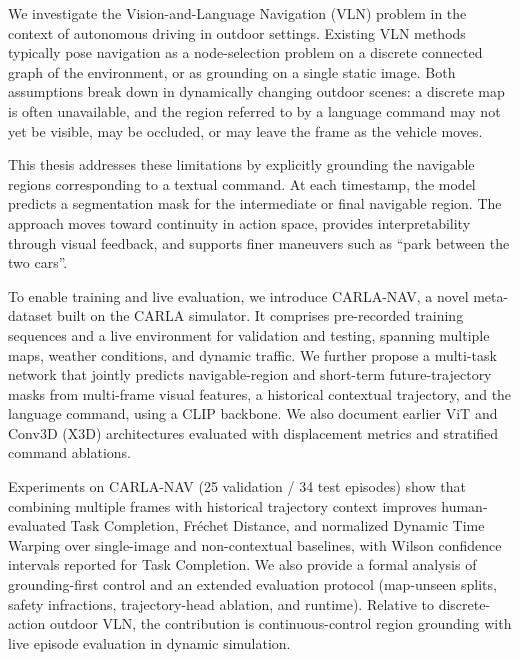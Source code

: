 We investigate the Vision-and-Language Navigation (VLN) problem in the context of autonomous driving in outdoor settings. Existing VLN methods typically pose navigation as a node-selection problem on a discrete connected graph of the environment, or as grounding on a single static image. Both assumptions break down in dynamically changing outdoor scenes: a discrete map is often unavailable, and the region referred to by a language command may not yet be visible, may be occluded, or may leave the frame as the vehicle moves.

This thesis addresses these limitations by explicitly grounding the navigable regions corresponding to a textual command. At each timestamp, the model predicts a segmentation mask for the intermediate or final navigable region. The approach moves toward continuity in action space, provides interpretability through visual feedback, and supports finer maneuvers such as ``park between the two cars''.

To enable training and live evaluation, we introduce CARLA-NAV, a novel meta-dataset built on the CARLA simulator. It comprises pre-recorded training sequences and a live environment for validation and testing, spanning multiple maps, weather conditions, and dynamic traffic. We further propose a multi-task network that jointly predicts navigable-region and short-term future-trajectory masks from multi-frame visual features, a historical contextual trajectory, and the language command, using a CLIP backbone. We also document earlier ViT and Conv3D (X3D) architectures evaluated with displacement metrics and stratified command ablations.

Experiments on CARLA-NAV (25 validation / 34 test episodes) show that combining multiple frames with historical trajectory context improves human-evaluated Task Completion, Fr\'{e}chet Distance, and normalized Dynamic Time Warping over single-image and non-contextual baselines, with Wilson confidence intervals reported for Task Completion. We also provide a formal analysis of grounding-first control and an extended evaluation protocol (map-unseen splits, safety infractions, trajectory-head ablation, and runtime). Relative to discrete-action outdoor VLN, the contribution is continuous-control region grounding with live episode evaluation in dynamic simulation.

